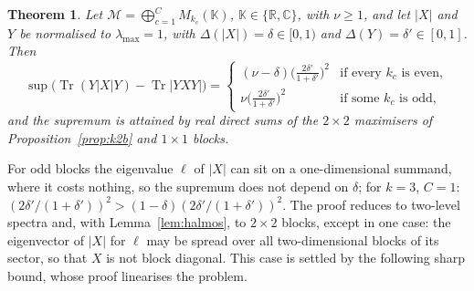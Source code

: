 \documentclass[11pt]{article}
\DeclareMathOperator{\Tr}{Tr}
\newcommand{\C}{\mathbb{C}}
\newcommand{\R}{\mathbb{R}}
\newcommand{\M}{\mathcal{M}}
\theoremstyle{plain}
\newtheorem{theorem}{Theorem}[section]
\theoremstyle{definition}
\theoremstyle{remark}
\begin{document}
\begin{theorem}\label{thm:exp3}
Let $\M=\bigoplus_{c=1}^CM_{k_c}(\mathbb K)$, $\mathbb K\in\{\R,\C\}$, with $\nu\ge1$, and let $|X|$ and $Y$ be normalised to
$\lambda_{\max}=1$, with $\Delta(|X|)=\delta\in[0,1)$ and $\Delta(Y)=\delta'\in[0,1]$. Then
\[
  \sup\bigl(\Tr(Y|X|Y)-\Tr|YXY|\bigr)=\begin{cases}(\nu-\delta)\bigl(\frac{2\delta'}{1+\delta'}\bigr)^2&\text{if every }k_c\text{ is even},\\[2pt]
  \nu\bigl(\frac{2\delta'}{1+\delta'}\bigr)^2&\text{if some }k_c\text{ is odd},\end{cases}
\]
and the supremum is attained by real direct sums of the $2\times2$ maximisers of Proposition~\ref{prop:k2b} and $1\times1$
blocks.
\end{theorem}

\noindent For odd blocks the eigenvalue $\ell$ of $|X|$ can sit on a one-dimensional summand, where it costs nothing, so
the supremum does not depend on $\delta$; for $k=3$, $C=1$: $(2\delta'/(1+\delta'))^2>(1-\delta)(2\delta'/(1+\delta'))^2$. The
proof reduces to two-level spectra and, with Lemma~\ref{lem:halmos}, to $2\times2$ blocks, except in one case: the
eigenvector of $|X|$ for $\ell$ may be spread over all two-dimensional blocks of its sector, so that $X$ is not block
diagonal. This case is settled by the following sharp bound, whose proof linearises the problem.
\end{document}
